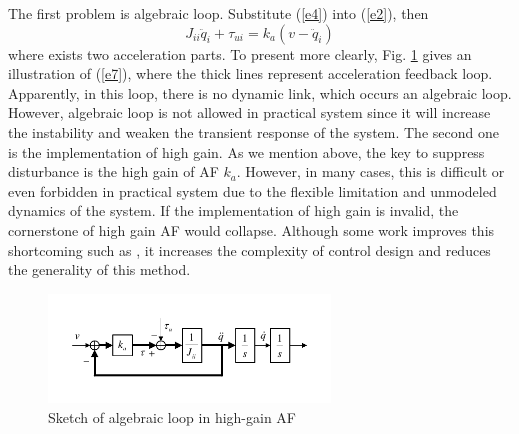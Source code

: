 \documentclass[letterpaper, 10 pt, conference]{ieeeconf}  %
\begin{document}
The first problem is algebraic loop.
Substitute (\ref{e4}) into (\ref{e2}), then
\begin{equation}
    J_{ii}\ddot{q}_i+\tau_{ui}=k_a(v-\ddot{q}_i) \label{e7}
\end{equation}
where exists two acceleration parts.
To present more clearly, Fig. \ref{f1} gives an illustration of (\ref{e7}), where the thick lines represent acceleration feedback loop.
Apparently, in this loop, there is no dynamic link, which occurs an algebraic loop.
However, algebraic loop is not allowed in practical system since it will increase the instability and weaken the transient response of the system.
The second one is the implementation of high gain.
As we mention above, the key to suppress disturbance is the high gain of AF $k_a$.
However, in many cases, this is difficult or even forbidden in practical system due to the flexible limitation and unmodeled dynamics of the system.
If the implementation of high gain is invalid, the cornerstone of high gain AF would collapse.
Although some work improves this shortcoming such as \cite{Han2000}, it increases the complexity of control design and reduces the generality of this method.
\begin{figure}[t]
    \centering
    \includegraphics[width=2.95in]{illustrations/fig1.pdf}
    \caption{Sketch of algebraic loop in high-gain AF}
    \label{f1}
\end{figure}
\end{document}
